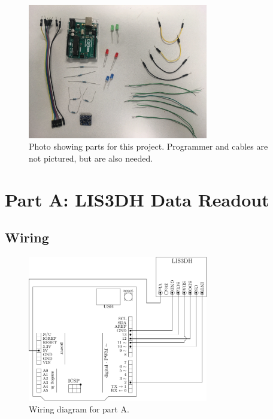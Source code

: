 \documentclass{article}
\begin{document}
\begin{figure}[H]
	\centering

	\includegraphics[max width = 0.7\textwidth]{parts.jpg}

	\caption{Photo showing parts for this project. Programmer and cables
	are not pictured, but are also needed. }

\end{figure}


\section{Part A: LIS3DH Data Readout}

\subsection{Wiring}


\begin{figure}[H]
	\centering

	\includegraphics[max width = 0.7\textwidth]{part_a_wiring.pdf}

	\caption{Wiring diagram for part A.}

\end{figure}
\end{document}
